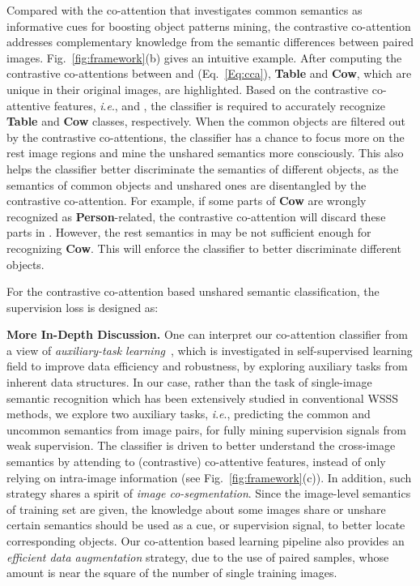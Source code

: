\documentclass[runningheads]{llncs}
\newcommand{\ie}{\textit{i}.\textit{e}.}
\begin{document}
Compared with the co-attention that investigates common semantics as informative cues for boosting object patterns mining,
the contrastive co-attention addresses complementary knowledge from the semantic differences between paired images. Fig.~\ref{fig:framework}(b) gives an intuitive example.
After computing the contrastive co-attentions between  and   (Eq.~\ref{Eq:cca}), \textbf{Table} and \textbf{Cow}, which are unique in their original images, are highlighted. Based on the contrastive co-attentive features, \ie,  and , the classifier is required to accurately recognize \textbf{Table} and \textbf{Cow} classes, respectively. When the common objects are filtered out by the contrastive co-attentions, the classifier has a chance to focus more on the rest image regions and mine the unshared semantics more consciously. This also helps the classifier better discriminate the semantics of different objects, as the semantics of common objects and unshared ones are disentangled  by the contrastive co-attention. For example, if some parts of \textbf{Cow} are wrongly recognized as \textbf{Person}-related, the contrastive co-attention will discard these parts in . However, the rest semantics in  may be not sufficient enough for recognizing \textbf{Cow}. This will enforce the classifier to better discriminate different objects.

For the contrastive co-attention based unshared semantic classification, the supervision loss is designed as:



\noindent\textbf{More In-Depth Discussion.} One can interpret our co-attention classifier from a view of \textit{auxiliary-task learning}~\cite{odena2017conditional,gidaris2018unsupervised}, which is investigated in self-supervised learning field to improve data efficiency and robustness, by exploring auxiliary tasks from inherent data structures. In our case, rather than the task of single-image semantic recognition which has been extensively studied in conventional WSSS methods, we explore two auxiliary
tasks, \ie, predicting the common and uncommon semantics from image pairs, for fully mining supervision signals from weak supervision. The classifier is driven to better understand the cross-image semantics by attending to (contrastive) co-attentive features, instead of only relying on intra-image information (see Fig.~\ref{fig:framework}(c)).  In addition, such strategy shares a spirit of \textit{image co-segmentation}. Since the image-level semantics of training set are given, the knowledge about some images share or unshare certain semantics should be used as a cue, or supervision signal, to better locate corresponding objects. Our co-attention based learning pipeline also provides an \textit{efficient data augmentation} strategy, due to the use of  paired samples, whose amount is near the square of the number of single training images.
\end{document}
